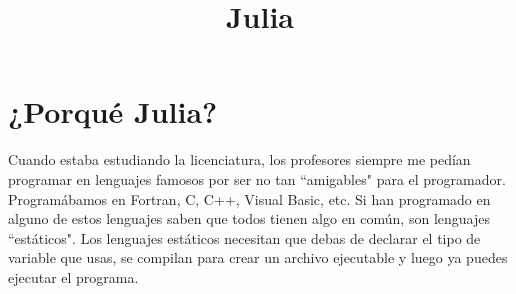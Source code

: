 \documentclass{article}
\title{Julia}
\author{}
\date{}
\begin{document}
\maketitle

\section{¿Porqué Julia?}

Cuando estaba estudiando la licenciatura, los profesores siempre me pedían programar en lenguajes famosos por ser no tan ``amigables" para el programador. Programábamos en Fortran, C, C++, Visual Basic, etc. Si han programado en alguno de estos lenguajes saben que todos tienen algo en común, son lenguajes ``estáticos". Los lenguajes estáticos necesitan que debas de declarar el tipo de variable que usas, se compilan para crear un archivo ejecutable y luego ya puedes ejecutar el programa.
\end{document}
